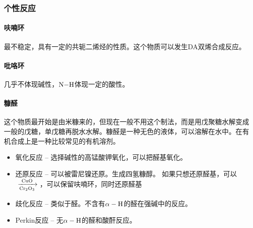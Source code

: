 \subsubsection{个性反应}

\paragraph{呋喃环} 最不稳定，具有一定的共轭二烯烃的性质。这个物质可以发生DA双烯合成反应。

\paragraph{吡咯环}  几乎不体现碱性，$\ce{N-H}$体现一定的酸性。


\paragraph{糠醛}  这个物质最开始是由米糠来的，但现在一般不用这个制法，而是用戊聚糖水解变成一般的戊糖，单戊糖再脱水水解。糠醛是一种无色的液体，可以溶解在水中。在有机合成上是一种比较常见的有机溶剂。
\begin{itemize}
    \item 氧化反应 -- 选择碱性的高锰酸钾氧化，可以把醛基氧化。
    \item 还原反应 -- 可以被雷尼镍还原。生成四氢糠醇。
          如果只想还原醛基，可以$\ce{->[CuO][Cr2O3]}$，可以保留呋喃环，同时还原醛基
    \item 歧化反应 -- 类似于醛。不含有$\alpha - \ce{H}$的醛在强碱中的反应。\
    \item Perkin反应 -- 无$\alpha - \ce{H}$的醛和酸酐反应。
\end{itemize}